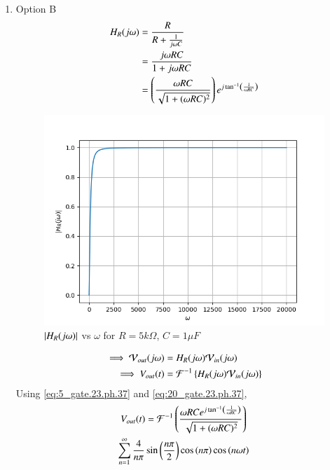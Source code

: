 \documentclass[journal,12pt,twocolumn]{IEEEtran}
\theoremstyle{remark}
\begin{document}
\begin{enumerate}
    \item Option B
    \begin{align}
        H_R(j\omega) &=  \frac{R}{R + \frac{1}{j\omega C}}\\
        &= \frac{j\omega RC}{1+j\omega RC}\\
        &= \left(\frac{\omega R C}{\sqrt{1 + (\omega R C)^2}}\right)e^{j\tan^{-1}\left(\frac{1}{\omega RC}\right)}\label{eq:20_gate.23.ph.37}
    \end{align}
    \begin{figure}[!h]
        \centering
        \includegraphics[width=\columnwidth]{figs/opt_b_hf.png}
        \caption{$\left\vert H_R(j\omega)\right\vert$ vs $\omega$ for $R=5k\Omega$, $C=1\mu F$}
        \label{fig:opt_b_hf_gate.ph.23.37}
    \end{figure}
    \begin{align}
        \implies \mathcal{V}_{out}(j\omega) &= H_R(j\omega)\mathcal{V}_{in}(j\omega)\\
        \implies V_{out}(t) &= \mathcal{F}^{-1}\left\{H_R(j\omega)\mathcal{V}_{in}(j\omega)\right\}
    \end{align}
     Using \eqref{eq:5_gate.23.ph.37} and \eqref{eq:20_gate.23.ph.37}, 
    \begin{multline}
    V_{out}(t)=\mathcal{F}^{-1}\left(\frac{\omega R C e^{j\tan^{-1}\left(\frac{1}{\omega RC}\right)}}{\sqrt{1 + (\omega R C)^2}}\right)\\ \sum_{n = 1}^{\infty}\frac{4}{n\pi}\sin{\ensuremath{\left(\frac{n\pi}{2}\right)}}\cos\left({n\pi}\right) \cos{\ensuremath{\left(n\omega t\right)}}
    \end{multline}
    \begin{figure}[!h]

\end{figure}
\end{enumerate}
\end{document}
